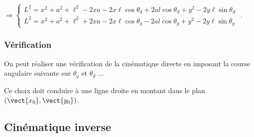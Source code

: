 \documentclass[10pt,fleqn]{article} %
\begin{document}
$
\Rightarrow
\left\{
\begin{array}{l}
L^2 = x^2  +a^2+\ell^2  -2xa -2x\ell\cos\theta_d+2al\cos\theta_d  +  y^2 - 2y \ell   \sin\theta_d  \\
L^2 = x^2  +a^2+\ell^2 +2xa -2x\ell\cos\theta_g-2al\cos\theta_g  +  y^2  -2y  \ell   \sin\theta_g 
\end{array}
\right.
$ .

\subsubsection{Vérification}
On peut réaliser une vérification de la cinématique directe en imposant la course angulaire suivante sur $\theta_g$ et $\theta_d$ ...

Ce choix doit conduire à une ligne droite en montant dans le plan $\left(\vect{x_0},\vect{y_0}\right)$.

\subsection{Cinématique inverse}
\end{document}
